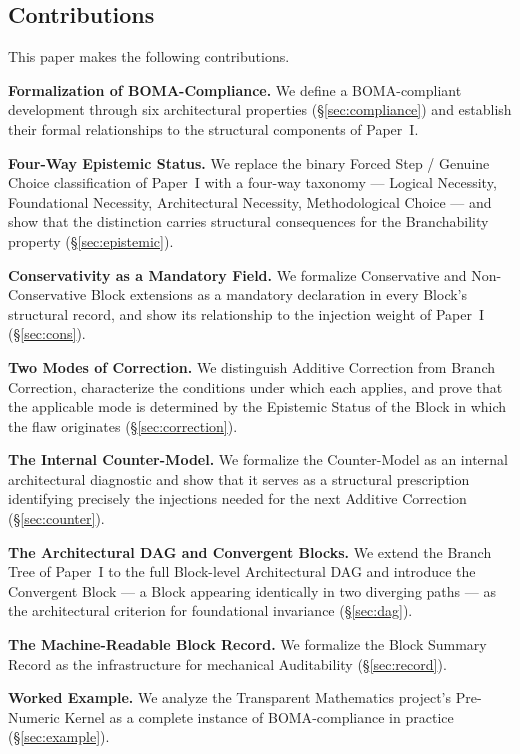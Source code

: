 \documentclass[12pt, a4paper]{article}
\theoremstyle{plain}
\theoremstyle{definition}
\theoremstyle{remark}
\newcommand{\BOMA}{\textsf{BOMA}}
\begin{document}
\subsection{Contributions}
\label{subsec:contributions}

This paper makes the following contributions.

\textbf{Formalization of \BOMA{}-Compliance.} We define a
\BOMA{}-compliant development through six architectural properties
(\S\ref{sec:compliance}) and establish their formal relationships to
the structural components of Paper~I.

\textbf{Four-Way Epistemic Status.} We replace the binary Forced Step
/ Genuine Choice classification of Paper~I with a four-way taxonomy
--- Logical Necessity, Foundational Necessity, Architectural
Necessity, Methodological Choice --- and show that the distinction
carries structural consequences for the Branchability property
(\S\ref{sec:epistemic}).

\textbf{Conservativity as a Mandatory Field.} We formalize
Conservative and Non-Conservative Block extensions as a mandatory
declaration in every Block's structural record, and show its
relationship to the injection weight of Paper~I (\S\ref{sec:cons}).

\textbf{Two Modes of Correction.} We distinguish Additive Correction
from Branch Correction, characterize the conditions under which each
applies, and prove that the applicable mode is determined by the
Epistemic Status of the Block in which the flaw originates
(\S\ref{sec:correction}).

\textbf{The Internal Counter-Model.} We formalize the Counter-Model
as an internal architectural diagnostic and show that it serves as a
structural prescription identifying precisely the injections needed
for the next Additive Correction (\S\ref{sec:counter}).

\textbf{The Architectural DAG and Convergent Blocks.} We extend the
Branch Tree of Paper~I to the full Block-level Architectural DAG and
introduce the Convergent Block --- a Block appearing identically in
two diverging paths --- as the architectural criterion for
foundational invariance (\S\ref{sec:dag}).

\textbf{The Machine-Readable Block Record.} We formalize the Block
Summary Record as the infrastructure for mechanical Auditability
(\S\ref{sec:record}).

\textbf{Worked Example.} We analyze the Transparent Mathematics
project's Pre-Numeric Kernel as a complete instance of
\BOMA{}-compliance in practice (\S\ref{sec:example}).
\end{document}
